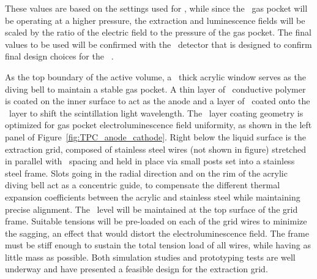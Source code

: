 These values are based on the settings used for \DSfs, while since the \DSks\ gas pocket will be operating at a higher pressure, the extraction and luminescence fields will be scaled by the ratio of the electric field to the pressure of the gas pocket. The final values to be used will be confirmed with the \DSps\ detector that is designed to confirm final design choices for the \DSks\ \LArTPC.

As the top boundary of the active volume, a \DSkPMMATPCThickness\ thick acrylic window serves as the diving bell to maintain a stable gas pocket. A thin layer of \Clevios\ conductive polymer is coated on the inner surface to act as the anode and a layer of \TPB\ coated onto the \Clevios\ layer to shift the scintillation light wavelength. The \Clevios\ layer coating geometry is optimized for gas pocket electroluminescence field uniformity, as shown in the left panel of Figure~\ref{fig:TPC_anode_cathode}. Right below the liquid surface is the extraction grid, composed of stainless steel wires (not shown in figure) stretched in parallel with \DSkWirePitch\ spacing and held in place via small posts set into a stainless steel frame. Slots going in the radial direction and on the rim of the acrylic diving bell act as a concentric guide, to compensate the different thermal expansion coefficients between the acrylic and stainless steel while maintaining precise alignment.  The \LAr\ level will be maintained at the top surface of the grid frame.  Suitable tensions will be pre-loaded on each of the grid wires to minimize the sagging, an effect that would distort the electroluminescence field. The frame must be stiff enough to sustain the total tension load of all wires, while having as little mass as possible. Both simulation studies and prototyping tests are well underway and have presented a feasible design for the extraction grid.

